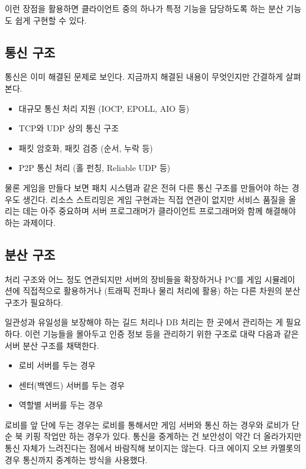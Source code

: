 \documentclass[chapter,kosection, 10.5pt, romanfixed, a4paper]{oblivoir}
\begin{document}
이런 장점을 활용하면 클라이언트 중의 하나가 특정 기능을 담당하도록 하는 
분산 기능도 쉽게 구현할 수 있다. 


\subsection{통신 구조}

통신은 이미 해결된 문제로 보인다. 지금까지 해결된 내용이 무엇인지만 
간결하게 살펴본다. 

\begin{itemize}
\item 대규모 통신 처리 지원 (IOCP, EPOLL, AIO 등)
\item TCP와 UDP 상의 통신 구조 
\item 패킷 암호화, 패킷 검증 (순서, 누락 등)
\item P2P 통신 처리 (홀 펀칭, Reliable UDP 등)
\end{itemize}

물론 게임을 만들다 보면 패치 시스템과 같은 전혀 다른 통신 구조를 
만들어야 하는 경우도 생긴다. 리소스 스트리밍은 게임 구현과는 
직접 연관이 없지만 서비스 품질을 올리는 데는 아주 중요하며 
서버 프로그래머가 클라이언트 프로그래머와 함께 해결해야 하는 과제이다. 

\subsection{분산 구조}

처리 구조와 어느 정도 연관되지만 서버의 장비들을 확장하거나 PC를 게임 
시뮬레이션에 직접적으로 활용하거나 (트래픽 전파나 물리 처리에 활용) 하는 
다른 차원의 분산 구조가 필요하다. 

일관성과 유일성을 보장해야 하는 길드 처리나 DB 처리는 한 곳에서 관리하는 게 
필요하다. 이런 기능들을 몰아두고 인증 정보 등을 관리하기 위한 구조로 대략
다음과 같은 서버 분산 구조를 채택한다. 

\begin{itemize}
\item 로비 서버를 두는 경우
\item 센터(백엔드) 서버를 두는 경우 
\item 역할별 서버를 두는 경우
\end{itemize}

로비를 앞 단에 두는 경우는 로비를 통해서만 게임 서버와 통신 하는 경우와 
로비가 단순 북 키핑 작업만 하는 경우가 있다. 통신을 중계하는 건 보안성이 
약간 더 올라가지만 통신 자체가 느려진다는 점에서 바람직해 보이지는 않는다. 
다크 에이지 오브 카멜롯의 경우 통신까지 중계하는 방식을 사용했다. 
\end{document}
